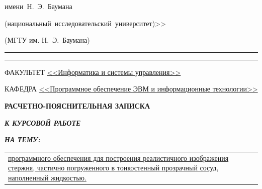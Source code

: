 \begin{titlepage}
\begin{center}
\begin{minipage}{0.85\textwidth}
{{                имени~Н.~Э.~Баумана

                (национальный~исследовательский~университет)>>
            }

                {(МГТУ им. Н.~Э.~Баумана)}
                \vspace{0.1cm}
            }
        \end{minipage}

        \vspace{0.2cm}
        \rule{\linewidth}{2.8pt}
        \rule[3ex]{\linewidth}{1pt}

        \begin{flushleft}
            {ФАКУЛЬТЕТ \uline{<<Информатика и системы управления>> \hfill}}

            \vspace{0.5cm}

            {КАФЕДРА \uline{<<Программное обеспечение ЭВМ и информационные технологии>> \hfill}}
        \end{flushleft}

        \vspace{2cm}

        {
            \Large{\textbf{РАСЧЕТНО-ПОЯСНИТЕЛЬНАЯ ЗАПИСКА}}

            \vspace{0.8cm}

            \large{\textbf{\textit{К КУРСОВОЙ РАБОТЕ}}}

            \vspace{0.75cm}

            \large{\textbf{\textit{НА ТЕМУ:}}}
        }

        \vspace{0.5cm}



        \begin{tabularx}{\linewidth}{@{}X@{}}
            \uline{ \large программного \large обеспечения \large для \large построения \large реалистичного \large изображения \large стержня, \large частично \large погруженного \large в \large тонкостенный \large прозрачный \large сосуд, \large наполненный \large жидкостью.
                \hfill}
        \end{tabularx}



\end{center}
\end{titlepage}
